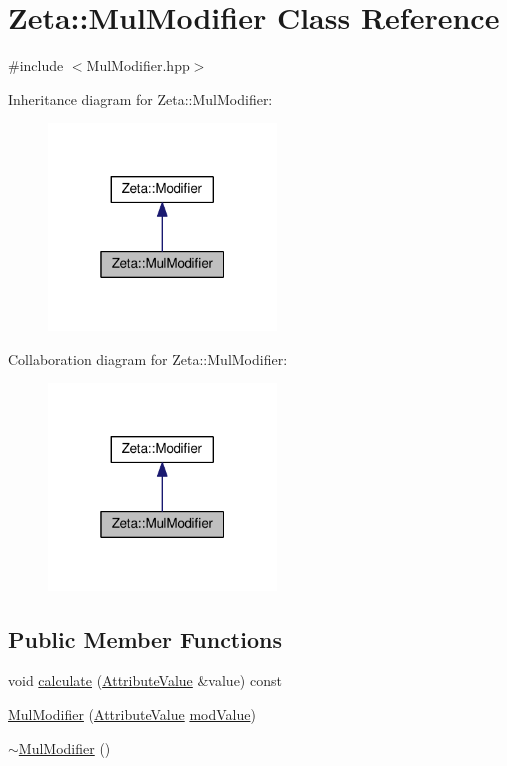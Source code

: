\hypertarget{classZeta_1_1MulModifier}{\section{Zeta\+:\+:Mul\+Modifier Class Reference}
\label{classZeta_1_1MulModifier}
}


{\ttfamily \#include $<$Mul\+Modifier.\+hpp$>$}



Inheritance diagram for Zeta\+:\+:Mul\+Modifier\+:\nopagebreak
\begin{figure}[H]
\begin{center}
\leavevmode
\includegraphics[width=172pt]{classZeta_1_1MulModifier__inherit__graph}
\end{center}
\end{figure}


Collaboration diagram for Zeta\+:\+:Mul\+Modifier\+:\nopagebreak
\begin{figure}[H]
\begin{center}
\leavevmode
\includegraphics[width=172pt]{classZeta_1_1MulModifier__coll__graph}
\end{center}
\end{figure}
\subsection*{Public Member Functions}
\begin{DoxyCompactItemize}
\item 
void \hyperlink{classZeta_1_1MulModifier_a499c654aca31ee826db5c88bd4792f52}{calculate} (\hyperlink{namespaceZeta_ab5947f98c0ab6302b51f8c6e93ec5581}{Attribute\+Value} \&value) const 
\item 
\hyperlink{classZeta_1_1MulModifier_a2535875f758af79637ecb690ff640dcb}{Mul\+Modifier} (\hyperlink{namespaceZeta_ab5947f98c0ab6302b51f8c6e93ec5581}{Attribute\+Value} \hyperlink{classZeta_1_1Modifier_ae9685e22722b0aaae9edd1a074a6251d}{mod\+Value})
\item 
\hyperlink{classZeta_1_1MulModifier_af31398376cb30d3a4a1d2794cd1954ba}{$\sim$\+Mul\+Modifier} ()
\end{DoxyCompactItemize}
